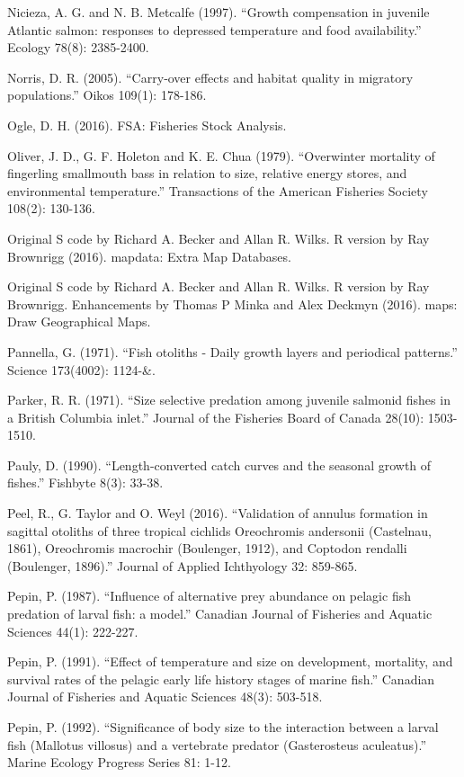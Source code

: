 \documentclass[]{book}
\begin{document}
Nicieza, A. G. and N. B. Metcalfe (1997). ``Growth compensation in
juvenile Atlantic salmon: responses to depressed temperature and food
availability.'' Ecology 78(8): 2385-2400.

Norris, D. R. (2005). ``Carry‐over effects and habitat quality in
migratory populations.'' Oikos 109(1): 178-186.

Ogle, D. H. (2016). FSA: Fisheries Stock Analysis.

Oliver, J. D., G. F. Holeton and K. E. Chua (1979). ``Overwinter
mortality of fingerling smallmouth bass in relation to size, relative
energy stores, and environmental temperature.'' Transactions of the
American Fisheries Society 108(2): 130-136.

Original S code by Richard A. Becker and Allan R. Wilks. R version by
Ray Brownrigg (2016). mapdata: Extra Map Databases.

Original S code by Richard A. Becker and Allan R. Wilks. R version by
Ray Brownrigg. Enhancements by Thomas P Minka and Alex Deckmyn (2016).
maps: Draw Geographical Maps.

Pannella, G. (1971). ``Fish otoliths - Daily growth layers and
periodical patterns.'' Science 173(4002): 1124-\&.

Parker, R. R. (1971). ``Size selective predation among juvenile salmonid
fishes in a British Columbia inlet.'' Journal of the Fisheries Board of
Canada 28(10): 1503-1510.

Pauly, D. (1990). ``Length-converted catch curves and the seasonal
growth of fishes.'' Fishbyte 8(3): 33-38.

Peel, R., G. Taylor and O. Weyl (2016). ``Validation of annulus
formation in sagittal otoliths of three tropical cichlids Oreochromis
andersonii (Castelnau, 1861), Oreochromis macrochir (Boulenger, 1912),
and Coptodon rendalli (Boulenger, 1896).'' Journal of Applied
Ichthyology 32: 859-865.

Pepin, P. (1987). ``Influence of alternative prey abundance on pelagic
fish predation of larval fish: a model.'' Canadian Journal of Fisheries
and Aquatic Sciences 44(1): 222-227.

Pepin, P. (1991). ``Effect of temperature and size on development,
mortality, and survival rates of the pelagic early life history stages
of marine fish.'' Canadian Journal of Fisheries and Aquatic Sciences
48(3): 503-518.

Pepin, P. (1992). ``Significance of body size to the interaction between
a larval fish (Mallotus villosus) and a vertebrate predator
(Gasterosteus aculeatus).'' Marine Ecology Progress Series 81: 1-12.
\end{document}
